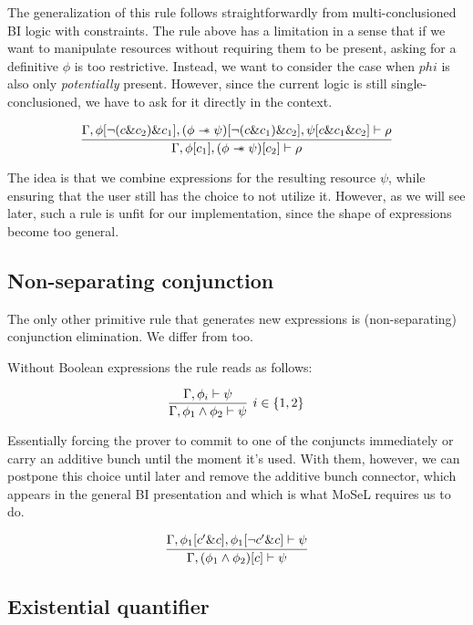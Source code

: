 The generalization of this rule follows straightforwardly from multi-conclusioned BI logic with constraints.
The rule above has a limitation in a sense that if we want to manipulate resources without requiring them to be present, asking for a definitive \(\phi\) is too restrictive.
Instead, we want to consider the case when \(phi\) is also only \emph{potentially} present.
However, since the current logic is still single-conclusioned, we have to ask for it directly in the context.

\[
\infer{\Gamma, \phi[c_1], (\phi \wand \psi)[c_2] \vdash \rho}
      {\Gamma, \phi[\neg (c \& c_2) \& c_1], (\phi \wand \psi)[\neg (c \& c_1) \& c_2], \psi[c \& c_1 \& c_2] \vdash \rho}
\]

The idea is that we combine expressions for the resulting resource \(\psi\), while ensuring that the user still has the choice to not utilize it.
However, as we will see later, such a rule is unfit for our implementation, since the shape of expressions become too general.

\subsection{Non-separating conjunction}
\label{sec:non-separ-conj}

The only other primitive rule that generates new expressions is (non-separating) conjunction elimination.
We differ from \citet{harlandResourceDistributionBooleanConstraints2003} too.

Without Boolean expressions the rule reads as follows:

\[
\infer[ i \in \{1,2\} ]
      {\Gamma, \phi_1 \wedge \phi_2 \vdash \psi}
      {\Gamma, \phi_i \vdash \psi}
\]

Essentially forcing the prover to commit to one of the conjuncts immediately or carry an additive bunch until the moment it's used.
With them, however, we can postpone this choice until later and remove the additive bunch connector, which appears in the general BI presentation and which is what MoSeL requires us to do.

\[
\infer{\Gamma, (\phi_1 \wedge \phi_2)[c] \vdash \psi}
      {\Gamma, \phi_1[c' \& c], \phi_1[\neg c' \& c] \vdash \psi}
\]

\subsection{Existential quantifier}
\label{subsec:exist-quant}

